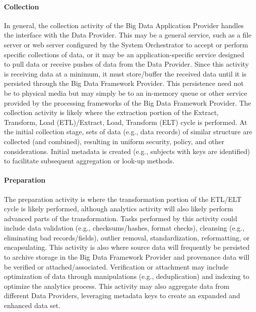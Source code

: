 \documentclass[9pt,]{article}
\let\oldparagraph\paragraph
\renewcommand{\paragraph}[1]{\oldparagraph{#1}\mbox{}}
\begin{document}
\hypertarget{collection}{%
\paragraph{Collection}\label{collection}}

In general, the collection activity of the Big Data Application Provider
handles the interface with the Data Provider. This may be a general
service, such as a file server or web server configured by the System
Orchestrator to accept or perform specific collections of data, or it
may be an application-specific service designed to pull data or receive
pushes of data from the Data Provider. Since this activity is receiving
data at a minimum, it must store/buffer the received data until it is
persisted through the Big Data Framework Provider. This persistence need
not be to physical media but may simply be to an in-memory queue or
other service provided by the processing frameworks of the Big Data
Framework Provider. The collection activity is likely where the
extraction portion of the Extract, Transform, Load (ETL)/Extract, Load,
Transform (ELT) cycle is performed. At the initial collection stage,
sets of data (e.g., data records) of similar structure are collected
(and combined), resulting in uniform security, policy, and other
considerations. Initial metadata is created (e.g., subjects with keys
are identified) to facilitate subsequent aggregation or look-up methods.

\hypertarget{preparation}{%
\paragraph{Preparation}\label{preparation}}

The preparation activity is where the transformation portion of the
ETL/ELT cycle is likely performed, although analytics activity will also
likely perform advanced parts of the transformation. Tasks performed by
this activity could include data validation (e.g., checksums/hashes,
format checks), cleansing (e.g., eliminating bad records/fields),
outlier removal, standardization, reformatting, or encapsulating. This
activity is also where source data will frequently be persisted to
archive storage in the Big Data Framework Provider and provenance data
will be verified or attached/associated. Verification or attachment may
include optimization of data through manipulations (e.g., deduplication)
and indexing to optimize the analytics process. This activity may also
aggregate data from different Data Providers, leveraging metadata keys
to create an expanded and enhanced data set.
\end{document}
